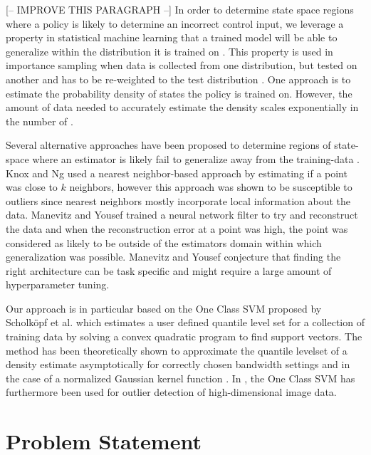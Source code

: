 \documentclass[10pt, conference]{ieeeconf}      %
\begin{document}
{\color{blue}[-- IMPROVE THIS PARAGRAPH --]} In order to determine state space regions where a policy is likely to determine
an incorrect control input, we leverage a
property in statistical machine learning that a trained model will be able to generalize within the distribution it is
trained on \cite{tokdar2010importance}. This property is used in importance sampling when data is collected from one
distribution, but tested on another and has to be re-weighted to the test distribution \cite{huang2006correcting}. One
approach is to estimate the probability density of states the policy is trained on. However, the amount of data needed to accurately estimate the density scales exponentially in the number of \cite{nadaraya1964estimating}.

Several alternative approaches have been proposed to determine regions of state-space where an estimator is likely fail
to generalize away from the training-data \cite{markou2003novelty}. Knox and Ng \cite{knox1998algorithms} used a nearest
neighbor-based approach by estimating if a point was close to $k$ neighbors, however this approach was shown to be
susceptible to outliers since nearest neighbors mostly incorporate local information about the data. Manevitz and Yousef
\cite{manevitz2002one} trained a neural network filter to try and reconstruct the data and when the reconstruction error
at a point was high, the point was considered as likely to be outside of the estimators domain within which
generalization was possible. Manevitz and Yousef conjecture  that finding the right architecture can be task specific
and might require a large amount of hyperparameter tuning.

Our approach is in particular based on the One Class SVM proposed by Scholk{\"o}pf et al. which estimates a user
defined quantile level set for a collection of training data by solving a convex quadratic program  to find support
vectors. The method has been theoretically shown to approximate the quantile levelset of a density estimate
asymptotically for correctly chosen bandwidth settings and in the case of a normalized Gaussian kernel function \cite{vert2006consistency}. 
In \cite{liu2014unsupervised}, the One Class SVM has furthermore been used for outlier detection of high-dimensional 
image data.

\section{Problem Statement}
\end{document}
